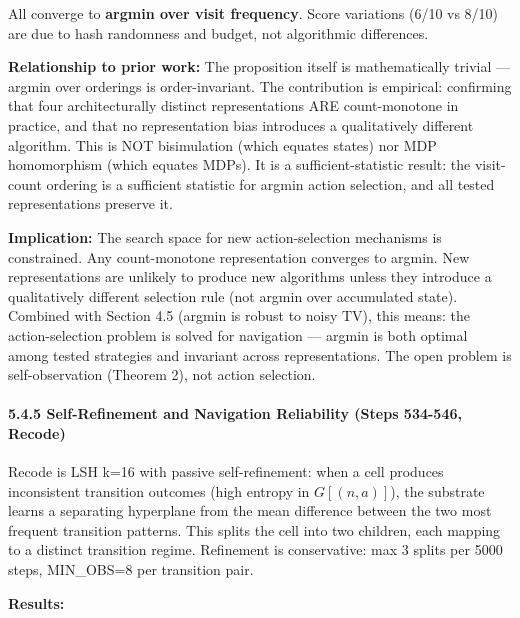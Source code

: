 \documentclass[
  11pt,
]{article}
\begin{document}
All converge to \textbf{argmin over visit frequency}. Score variations
(6/10 vs 8/10) are due to hash randomness and budget, not algorithmic
differences.

\textbf{Relationship to prior work:} The proposition itself is
mathematically trivial --- argmin over orderings is order-invariant. The
contribution is empirical: confirming that four architecturally distinct
representations ARE count-monotone in practice, and that no
representation bias introduces a qualitatively different algorithm. This
is NOT bisimulation (which equates states) nor MDP homomorphism (which
equates MDPs). It is a sufficient-statistic result: the visit-count
ordering is a sufficient statistic for argmin action selection, and all
tested representations preserve it.

\textbf{Implication:} The search space for new action-selection
mechanisms is constrained. Any count-monotone representation converges
to argmin. New representations are unlikely to produce new algorithms
unless they introduce a qualitatively different selection rule (not
argmin over accumulated state). Combined with Section 4.5 (argmin is
robust to noisy TV), this means: the action-selection problem is solved
for navigation --- argmin is both optimal among tested strategies and
invariant across representations. The open problem is self-observation
(Theorem 2), not action selection.

\paragraph{5.4.5 Self-Refinement and Navigation Reliability (Steps
534-546,
Recode)}\label{self-refinement-and-navigation-reliability-steps-534-546-recode}

Recode is LSH k=16 with passive self-refinement: when a cell produces
inconsistent transition outcomes (high entropy in \(G[(n, a)]\)), the
substrate learns a separating hyperplane from the mean difference
between the two most frequent transition patterns. This splits the cell
into two children, each mapping to a distinct transition regime.
Refinement is conservative: max 3 splits per 5000 steps, MIN\_OBS=8 per
transition pair.

\textbf{Results:}
\end{document}
